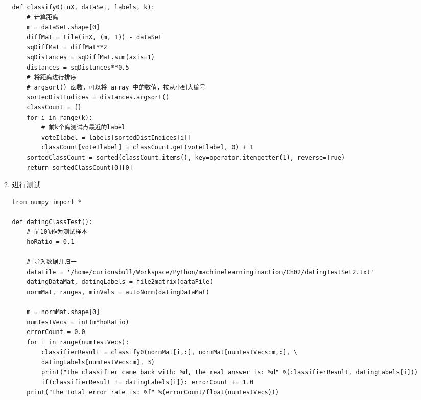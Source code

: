 \documentclass[11pt]{ctexart}
\begin{document}
\begin{enumerate}
\begin{enumerate}
\begin{lstlisting}
def classify0(inX, dataSet, labels, k):
    # 计算距离
    m = dataSet.shape[0]
    diffMat = tile(inX, (m, 1)) - dataSet
    sqDiffMat = diffMat**2
    sqDistances = sqDiffMat.sum(axis=1)
    distances = sqDistances**0.5
    # 将距离进行排序
    # argsort() 函数，可以将 array 中的数值，按从小到大编号
    sortedDistIndices = distances.argsort()
    classCount = {}
    for i in range(k):
        # 前k个离测试点最近的label
        voteIlabel = labels[sortedDistIndices[i]]
        classCount[voteIlabel] = classCount.get(voteIlabel, 0) + 1
    sortedClassCount = sorted(classCount.items(), key=operator.itemgetter(1), reverse=True)
    return sortedClassCount[0][0]
\end{lstlisting}
\item 进行测试
\lstset{language=Python,label= ,caption= ,captionpos=b,numbers=none}
\begin{lstlisting}
from numpy import *

def datingClassTest():
    # 前10%作为测试样本
    hoRatio = 0.1

    # 导入数据并归一
    dataFile = '/home/curiousbull/Workspace/Python/machinelearninginaction/Ch02/datingTestSet2.txt'
    datingDataMat, datingLabels = file2matrix(dataFile)
    normMat, ranges, minVals = autoNorm(datingDataMat)

    m = normMat.shape[0]
    numTestVecs = int(m*hoRatio)
    errorCount = 0.0
    for i in range(numTestVecs):
        classifierResult = classify0(normMat[i,:], normMat[numTestVecs:m,:], \
        datingLabels[numTestVecs:m], 3)
        print("the classifier came back with: %d, the real answer is: %d" %(classifierResult, datingLabels[i]))
        if(classifierResult != datingLabels[i]): errorCount += 1.0
    print("the total error rate is: %f" %(errorCount/float(numTestVecs)))
\end{lstlisting}
\end{enumerate}
\end{enumerate}
\end{document}
